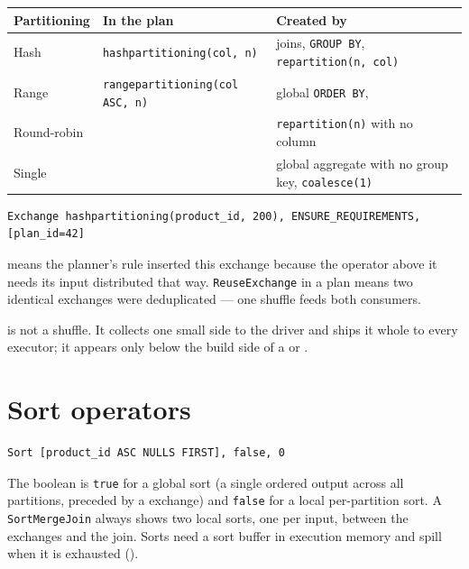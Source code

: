 \begin{table}[H]
\centering\footnotesize
\renewcommand{\arraystretch}{1.2}
\begin{tabular}{@{}P{3cm}P{4.4cm}P{6cm}@{}}
\toprule
\textbf{Partitioning} & \textbf{In the plan} & \textbf{Created by} \\
\midrule
Hash & \texttt{hashpartitioning(col, n)} & joins, \texttt{GROUP BY}, \texttt{repartition(n, col)} \\
Range & \texttt{rangepartitioning(col ASC, n)} & global \texttt{ORDER BY},  \\
Round-robin &  & \texttt{repartition(n)} with no column \\
Single &  & global aggregate with no group key, \texttt{coalesce(1)} \\
\bottomrule
\end{tabular}
\end{table}

\begin{lstlisting}[language=text,numbers=none,caption={A shuffle exchange},captionpos=b]
Exchange hashpartitioning(product_id, 200), ENSURE_REQUIREMENTS, [plan_id=42]
\end{lstlisting}

 means the planner's  rule
inserted this exchange because the operator above it needs its input distributed
that way. \texttt{ReuseExchange} in a plan means two identical exchanges were
deduplicated --- one shuffle feeds both consumers.

 is not a shuffle. It collects one small side to the
driver and ships it whole to every executor; it appears only below the build side
of a  or .

\section{Sort operators}

\begin{lstlisting}[language=text,numbers=none]
Sort [product_id ASC NULLS FIRST], false, 0
\end{lstlisting}

The boolean is \texttt{true} for a global sort (a single ordered output across all
partitions, preceded by a  exchange) and \texttt{false}
for a local per-partition sort. A \texttt{SortMergeJoin} always shows two local
sorts, one per input, between the exchanges and the join. Sorts need a sort
buffer in execution memory and spill when it is exhausted ().


